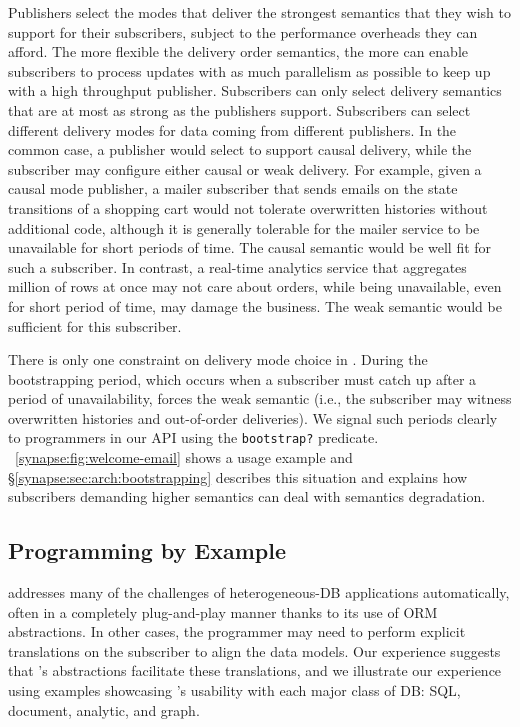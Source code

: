 Publishers select the modes that deliver the strongest semantics that
they wish to support for their subscribers, subject to the performance
overheads they can afford.  The more flexible the delivery order
semantics, the more \synapse can enable subscribers to process updates
with as much parallelism as possible to keep up with a high throughput
publisher.  Subscribers can only select delivery
semantics that are at most as strong as the publishers support.
Subscribers can select different delivery modes for data coming
from different publishers.  In the common case,
a publisher would select to support causal delivery, while the
subscriber may configure either causal or weak delivery. For example,
given a causal mode publisher, a mailer subscriber that sends emails
on the state transitions of a shopping cart would not tolerate
overwritten histories without additional code, although it is
generally tolerable for the mailer service to be unavailable for short
periods of time. The causal semantic would be well fit for
such a subscriber.  In contrast, a real-time analytics service that
aggregates million of rows at once may not care about orders, while
being unavailable, even for short period of time, may damage the
business.  The weak semantic would be sufficient for this subscriber.

There is only one constraint on delivery mode choice in
\synapse.  During the bootstrapping period, which occurs when a
subscriber must catch up after a period of unavailability, \synapse
forces the weak semantic (i.e., the subscriber may witness overwritten
histories and out-of-order deliveries).  We signal such periods
clearly to programmers in our API using the {\tt bootstrap?}
predicate. \F~\ref{synapse:fig:welcome-email} shows a usage example and
\S\ref{synapse:sec:arch:bootstrapping} describes this situation and
explains how subscribers demanding higher semantics can deal with semantics
degradation.

\subsection{\synapse Programming by Example}
\label{synapse:sec:examples}

\synapse addresses many of the challenges of heterogeneous-DB applications automatically, often in a completely plug-and-play manner thanks to its use of ORM abstractions.
In other cases, the programmer may need to perform explicit translations on the subscriber to align the data models.
Our experience suggests that \synapse's abstractions facilitate these translations, and we illustrate our experience using examples showcasing \synapse's usability with each major class of DB: SQL, document, analytic, and graph.



